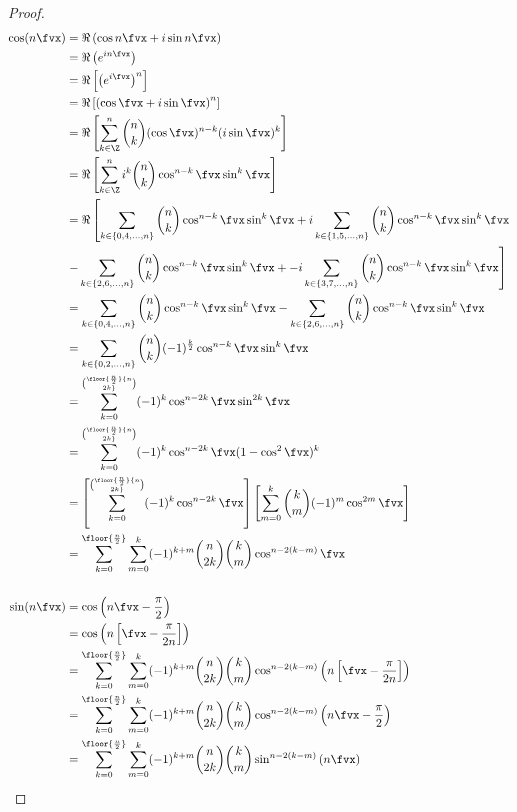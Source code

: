 \begin{proof}
\begin{align*}
  \cos(n\fvx)
    &= \Re\left(\cos n\fvx + i\sin n\fvx \right)
  \\&= \Re\left( e^{in\fvx}\right)
  \\&= \Re\left[\left( e^{i\fvx}\right)^n\right]
  \\&= \Re\left[\left( \cos\fvx + i\sin\fvx \right)^n\right]
  \\&= \Re\left[\sum_{k\in\Z}^n {n\choose k}(\cos\fvx)^{n-k} (i\sin\fvx)^k\right]
  \\&= \Re\left[\sum_{k\in\Z}^n i^k {n\choose k}\cos^{n-k}\fvx \sin^k\fvx \right]
  \\&= \Re\left[  \sum_{k\in\{0,4,\ldots,n\}} {n\choose k} \cos^{n-k}\fvx \sin^k\fvx +
        i\sum_{k\in\{1,5,\ldots,n\}} {n\choose k} \cos^{n-k}\fvx \sin^k\fvx  \right.
       \\& \left.
        -\sum_{k\in\{2,6,\ldots,n\}} {n\choose k} \cos^{n-k}\fvx \sin^k\fvx +
       -i\sum_{k\in\{3,7,\ldots,n\}} {n\choose k} \cos^{n-k}\fvx \sin^k\fvx \right]
  \\&= \sum_{k\in\{0,4,\ldots,n\}} {n\choose k} \cos^{n-k}\fvx \sin^k\fvx 
        -\sum_{k\in\{2,6,\ldots,n\}} {n\choose k} \cos^{n-k}\fvx \sin^k\fvx 
  \\&=   \sum_{k\in\{0,2,\ldots,n\}} {n\choose k}(-1)^{\frac{k  }{2}} \cos^{n-k}\fvx \sin^k\fvx 
  \\&=   \sum_{k=0}^\floor{\frac{n}{2}}     {n\choose 2k  }(-1)^k   \cos^{n-2k  }\fvx \sin^{2k  }\fvx 
  \\&=   \sum_{k=0}^\floor{\frac{n}{2}}     {n\choose 2k  }(-1)^k   \cos^{n-2k  }\fvx (1-\cos^2\fvx)^k 
  \\&=   \left[\sum_{k=0}^\floor{\frac{n}{2}}     {n\choose 2k  }(-1)^k   \cos^{n-2k  }\fvx \right]
         \left[\sum_{m=0}^k {k\choose m}(-1)^m\cos^{2m}\fvx \right] 
  \\&=   \sum_{k=0}^\floor{\frac{n}{2}}\sum_{m=0}^k      
         (-1)^{k+m}{n\choose 2k  }{k\choose m}   \cos^{n-2(k-m)}\fvx 
  \\
  \\
  \sin(n\fvx)
    &= \cos\left(n\fvx-\frac{\pi}{2}\right)
  \\&= \cos\left(n\left[\fvx-\frac{\pi}{2n}\right]\right)
  \\&= \sum_{k=0}^\floor{\frac{n}{2}}\sum_{m=0}^k      
       (-1)^{k+m}{n\choose 2k}{k\choose m} \cos^{n-2(k-m)}\left(n\left[\fvx-\frac{\pi}{2n}\right]\right)
  \\&= \sum_{k=0}^\floor{\frac{n}{2}}\sum_{m=0}^k
       (-1)^{k+m}{n\choose 2k}{k\choose m} \cos^{n-2(k-m)}\left(n\fvx-\frac{\pi}{2}\right)
  \\&= \sum_{k=0}^\floor{\frac{n}{2}}\sum_{m=0}^k
       (-1)^{k+m}{n\choose 2k}{k\choose m} \sin^{n-2(k-m)}\left(n\fvx\right)
\end{align*}
\end{proof}

